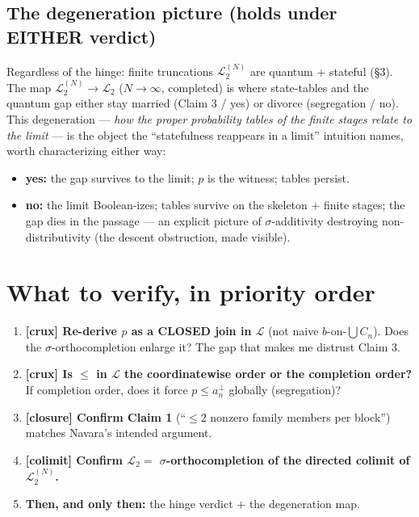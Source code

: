 \documentclass[11pt]{article}
\newcommand{\Lt}{\mathcal{L}_2}
\newcommand{\Lcal}{\mathcal{L}}
\begin{document}
\subsection*{The degeneration picture (holds under EITHER verdict)}

Regardless of the hinge: finite truncations $\Lt^{(N)}$ are quantum + stateful
(\S3). The map $\Lt^{(N)}\to\Lt$ ($N\to\infty$, completed) is where
state-tables and the quantum gap either stay married (Claim 3 / yes) or divorce
(segregation / no). This degeneration --- \emph{how the proper probability
tables of the finite stages relate to the limit} --- is the object the
``statefulness reappears in a limit'' intuition names, worth characterizing
either way:
\begin{itemize}[noitemsep]
  \item \textbf{yes:} the gap survives to the limit; $p$ is the witness; tables
    persist.
  \item \textbf{no:} the limit Boolean-izes; tables survive on the skeleton $+$
    finite stages; the gap dies in the passage --- an explicit picture of
    $\sigma$-additivity destroying non-distributivity (the descent obstruction,
    made visible).
\end{itemize}

\section{What to verify, in priority order}

\begin{enumerate}[label=\textbf{\arabic*.},leftmargin=2em,itemsep=2pt]
  \item \textbf{[crux] Re-derive $p$ as a CLOSED join in $\Lcal$} (not naive
    $b$-on-$\bigcup C_n$). Does the $\sigma$-orthocompletion enlarge it? The gap
    that makes me distrust Claim 3.
  \item \textbf{[crux] Is $\le$ in $\Lcal$ the coordinatewise order or the
    completion order?} If completion order, does it force $p\le a_n^\perp$
    globally (segregation)?
  \item \textbf{[closure] Confirm Claim 1} (``$\le2$ nonzero family members per
    block'') matches Navara's intended argument.
  \item \textbf{[colimit] Confirm $\Lt=$ $\sigma$-orthocompletion of the
    directed colimit of $\Lt^{(N)}$.}
  \item \textbf{Then, and only then:} the hinge verdict $+$ the degeneration
    map.
\end{enumerate}
\end{document}
